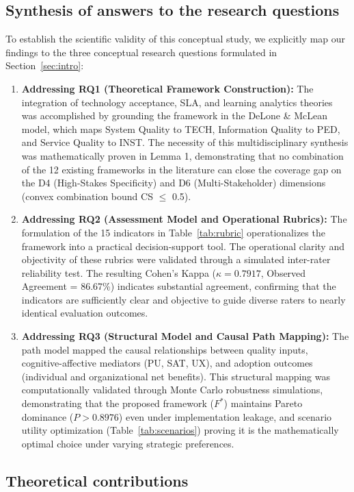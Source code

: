 \documentclass[11pt,a4paper]{article}
\begin{document}
\subsection{Synthesis of answers to the research questions}
To establish the scientific validity of this conceptual study, we explicitly map our findings to the three conceptual research questions formulated in Section~\ref{sec:intro}:
\begin{enumerate}
  \item \textbf{Addressing RQ1 (Theoretical Framework Construction):} The integration of technology acceptance, SLA, and learning analytics theories was accomplished by grounding the framework in the DeLone \& McLean model, which maps System Quality to TECH, Information Quality to PED, and Service Quality to INST. The necessity of this multidisciplinary synthesis was mathematically proven in Lemma 1, demonstrating that no combination of the 12 existing frameworks in the literature can close the coverage gap on the D4 (High-Stakes Specificity) and D6 (Multi-Stakeholder) dimensions (convex combination bound CS $\le$ 0.5).
  \item \textbf{Addressing RQ2 (Assessment Model and Operational Rubrics):} The formulation of the 15 indicators in Table~\ref{tab:rubric} operationalizes the framework into a practical decision-support tool. The operational clarity and objectivity of these rubrics were validated through a simulated inter-rater reliability test. The resulting Cohen's Kappa ($\kappa = 0.7917$, Observed Agreement = 86.67\%) indicates substantial agreement, confirming that the indicators are sufficiently clear and objective to guide diverse raters to nearly identical evaluation outcomes.
  \item \textbf{Addressing RQ3 (Structural Model and Causal Path Mapping):} The path model mapped the causal relationships between quality inputs, cognitive-affective mediators (PU, SAT, UX), and adoption outcomes (individual and organizational net benefits). This structural mapping was computationally validated through Monte Carlo robustness simulations, demonstrating that the proposed framework ($F^*$) maintains Pareto dominance ($P > 0.8976$) even under implementation leakage, and scenario utility optimization (Table~\ref{tab:scenarios}) proving it is the mathematically optimal choice under varying strategic preferences.
\end{enumerate}

\subsection{Theoretical contributions}
\end{document}

